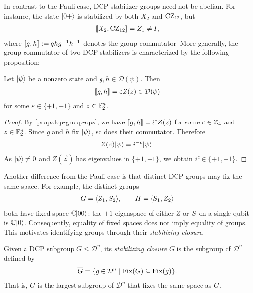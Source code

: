 In contrast to the Pauli case, DCP stabilizer groups need not be abelian. For instance, the state $\ket{0+}$ is stabilized by both $X_2$ and $\CZ_{12}$, but
\begin{align}
    \gcomm{X_2}{\CZ_{12}}=Z_1\neq I,
\end{align}
where $\gcomm{g}{h}:=ghg^{-1}h^{-1}$ denotes the group commutator.
More generally, the group commutator of two DCP stabilizers is characterized by the following proposition:

\begin{proposition}
    Let $\ket{\psi}$ be a nonzero state and
    $g,h\in\mathcal{D}(\psi)$. Then
    \begin{align}
        \gcomm{g}{h}=\varepsilon Z(\vec{z})
        \in\mathcal{D}(\psi)
    \end{align}
    for some $\varepsilon\in\{+1,-1\}$ and
    $\vec{z}\in\F_2^n$.
\end{proposition}

\begin{proof}
    By \cref{prop:dcp-group-ops}, we have
    $\gcomm{g}{h}=i^c Z(\vec{z})$ for some $c\in\Z_4$
    and $\vec{z}\in\F_2^n$.
    Since $g$ and $h$ fix $\ket{\psi}$, so does their
    commutator. Therefore
    \begin{align}
        Z(\vec{z})\ket{\psi}=i^{-c}\ket{\psi}.
    \end{align}
    As $\ket{\psi}\neq 0$ and $Z(\vec{z})$ has
    eigenvalues in $\{+1,-1\}$, we obtain
    $i^c\in\{+1,-1\}$.
\end{proof}

Another difference from the Pauli case is that distinct DCP groups may fix the same space.
For example, the distinct groups
\begin{align}
    G=\langle Z_1,\S_2\rangle,
    \qquad
    H=\langle \S_1,Z_2\rangle
\end{align}
both have fixed space $\C\ket{00}$: the $+1$ eigenspace
of either $Z$ or $\S$ on a single qubit is $\C\ket{0}$.
Consequently, equality of fixed spaces does not imply
equality of groups. This motivates identifying groups
through their \emph{stabilizing closure}.

\begin{definition}\label{def:stabilizing-closure}
    Given a DCP subgroup $G \le \mathcal{D}^n$, its \emph{stabilizing closure} $\overline{G}$ is the subgroup of $\mathcal{D}^n$ defined by
    \begin{align}
        \overline{G} = \{ g \in \mathcal{D}^n \mid \Fix(G) \subseteq \Fix(g) \}.
    \end{align}
    That is, $\overline{G}$ is the largest subgroup of $\mathcal{D}^n$ that fixes the same space as $G$.
\end{definition}


